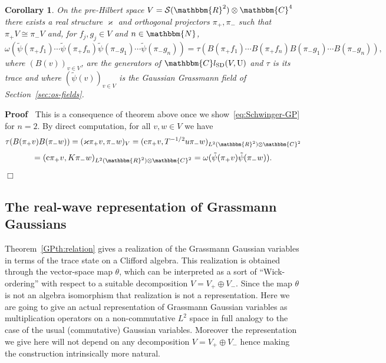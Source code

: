 \documentclass[11pt]{article}
\newcommand{\tmop}[1]{\ensuremath{\operatorname{#1}}}
\newenvironment{proof}{\noindent\textbf{Proof\ }}{\hspace*{\fill}$\Box$\medskip}
\newtheorem{corollary}{Corollary}
\begin{document}
\begin{corollary}
  \label{GPcor:schwinger}On the pre-Hilbert space $V =\mathcal{S}
  (\mathbbm{R}^2) \otimes \mathbbm{C}^4$ there exists a real structure
  $\varkappa$ and orthogonal projectors $\pi_+, \pi_-$ such that $\pi_+ V
  \cong \pi_- V$ and, for $f_j, g_j \in V$ and $n \in \mathbbm{N}$,
  \begin{equation}
    \omega (\tilde{\psi} (\pi_+ f_1) \cdots \tilde{\psi} (\pi_+ f_n)
    \tilde{\psi} (\pi_- g_1) \cdots \tilde{\psi} (\pi_- g_n)) = \tau (B (\pi_+
    f_1) \cdots B (\pi_+ f_n) B (\pi_- g_1) \cdots B (\pi_- g_n)),
    \label{eq:Schwinger-GP}
  \end{equation}
  where $(B (v))_{v \in V}$, are the generators of $\mathbbm{C}l_{\tmop{SD}}
  (V, \mathrm{U})$ and $\tau$ is its trace and where $(\tilde{\psi} (v))_{v
  \in V}$ is the Gaussian Grassmann field of Section~\ref{sec:os-fields}.
\end{corollary}

\begin{proof}
  This is a consequence of theorem above once we
  show~{\eqref{eq:Schwinger-GP}} for $n = 2$. By direct computation, for all
  $v, w \in V$ we have
  \[ \tau (B (\pi_+ v) B (\pi_- w)) = (\varkappa \pi_+ v, \pi_- w)_V =
     (\mathrm{c} \pi_+ v, T^{- 1 / 2} u \pi_- w)_{L^2 (\mathbbm{R}^2) \otimes
     \mathbbm{C}^2} \]
  \[ = (\mathrm{c} \pi_+ v, K \pi_- w)_{L^2 (\mathbbm{R}^2) \otimes
     \mathbbm{C}^2} = \omega (\tilde{\psi} (\pi_+ v) \tilde{\psi} (\pi_- w)) .
  \]
\end{proof}

\subsection{The real-wave representation of Grassmann Gaussians}

Theorem~\ref{GPth:relation} gives a realization of the Grassmann Gaussian
variables in terms of the trace state on a Clifford algebra. This realization
is obtained through the vector-space map $\theta$, which can be interpreted as
a sort of ``Wick-ordering'' with respect to a suitable decomposition $V = V_+
\oplus V_-$. Since the map $\theta$ is not an algebra isomorphism that
realization is not a representation. Here we are going to give an actual
representation of Grassmann Gaussian variables as multiplication operators on
a non-commutative $L^2$ space in full analogy to the case of the usual
(commutative) Gaussian variables. Moreover the representation we give here
will not depend on any decomposition $V = V_+ \oplus V_-$ hence making the
construction intrinsically more natural.
\end{document}

